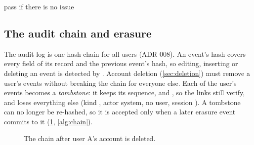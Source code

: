 \begin{algorithm}[htbp]
  \caption{Reply verification (\texttt{verify\_explanation}).}\label{alg:verify}
  \Return pass if there is no issue\;
\end{algorithm}

\subsection{The audit chain and erasure}\label{sec:chain}

The audit log is one hash chain for all users (ADR-008). An event's hash covers every field of its record and the
previous event's hash, so editing, inserting or deleting an event is detected by . Account deletion
(\cref{sec:deletion}) must remove a user's events without breaking the chain for everyone else. Each of the user's
events becomes a \emph{tombstone}: it keeps its sequence,  and , so the links still
verify, and loses everything else (kind , actor system, no user, session ). A tombstone can no
longer be re-hashed, so it is accepted only when a later erasure event commits to it (\cref{fig:chain},
\cref{alg:chain}).

\begin{figure}[htbp]
  \centering
  
  \caption{The chain after user A's account is deleted.}\label{fig:chain}
\end{figure}

